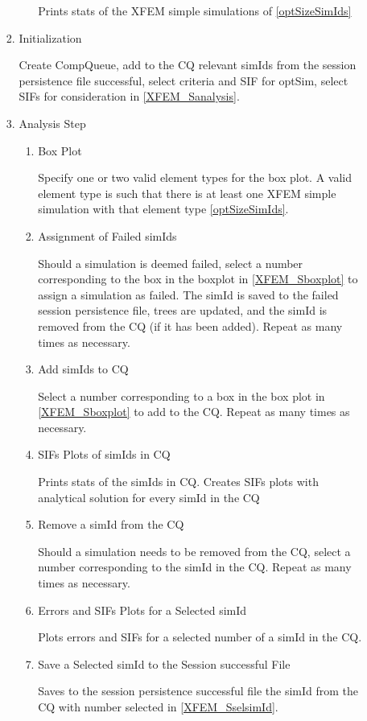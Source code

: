 \documentclass[10pt,a4paper]{article}
\begin{document}
\begin{enumerate}
\begin{enumerate}
\begin{enumerate}
\begin{enumerate}
Prints stats of the XFEM simple simulations of \ref{optSizeSimIds}


\end{enumerate}
\item Initialization

Create CompQueue, add to the CQ relevant simIds from the session persistence file successful, select criteria and SIF for optSim, select SIFs for consideration in \ref{XFEM_Sanalysis}.
\item Analysis Step\label{XFEM_Sanalysis}
\begin{enumerate}
\item Box Plot\label{XFEM_Sboxplot}

Specify one or two valid element types for the box plot. A valid element type is such that there is at least one XFEM simple simulation with that element type \ref{optSizeSimIds}.
\item Assignment of Failed simIds

Should a simulation is deemed failed, select a number corresponding to the box in the boxplot in \ref{XFEM_Sboxplot} to assign a simulation as failed. The simId is saved to the failed session persistence file, trees are updated, and the simId is removed from the CQ (if it has been added). Repeat as many times as necessary.

\item Add simIds to CQ

Select a number corresponding to a box in the box plot in \ref{XFEM_Sboxplot} to add to the CQ. Repeat as many times as necessary.
\item SIFs Plots of simIds in CQ

Prints stats of the simIds in CQ. Creates SIFs plots with analytical solution for every simId in the CQ
\item Remove a simId from the CQ

Should a simulation needs to be removed from the CQ, select a number corresponding to the simId in the CQ. Repeat as many times as necessary.
\item Errors and SIFs Plots for a Selected simId\label{XFEM_SselsimId}

Plots errors and SIFs for a selected number of a simId in the CQ.
\item Save a Selected simId to the Session successful File

Saves to the session persistence successful file the simId from the CQ with number selected in \ref{XFEM_SselsimId}.

\end{enumerate}
\end{enumerate}


\end{enumerate}
\end{enumerate}
\end{document}
